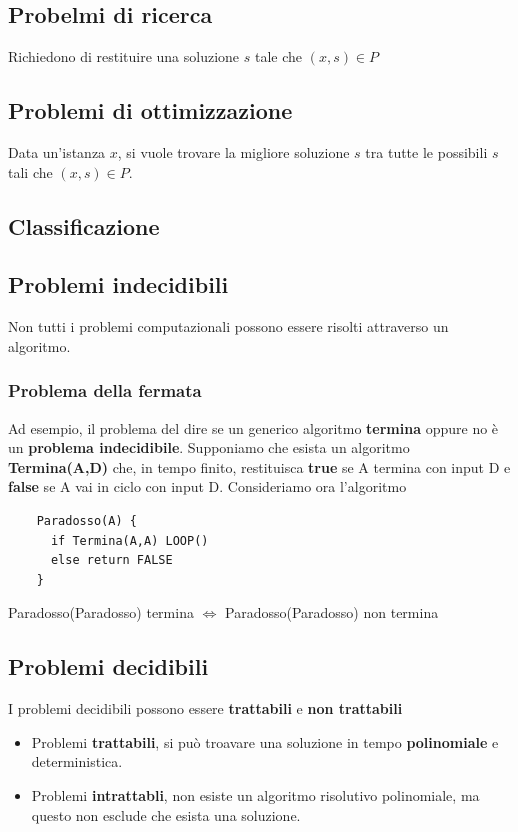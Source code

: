 \documentclass{article}
\begin{document}
\subsection*{Probelmi di ricerca}
Richiedono di restituire una soluzione \(s\) tale che \((x,s) \in P\)
\subsection*{Problemi di ottimizzazione}
Data un'istanza \(x\), si vuole trovare la migliore soluzione \(s\) tra tutte le possibili \(s\) tali che \((x,s) \in P\).

\subsection{Classificazione}
\subsection*{Problemi indecidibili}
Non tutti i problemi computazionali possono essere risolti attraverso un algoritmo.
\subsubsection*{Problema della fermata}
Ad esempio, il problema del dire se un generico algoritmo \textbf{termina} oppure no è un \textbf{problema indecidibile}. Supponiamo che esista un algoritmo \textbf{Termina(A,D)} che, in tempo finito, restituisca \textbf{true} se A termina con input D e \textbf{false} se A vai in ciclo con input D. Consideriamo ora l'algoritmo
\begin{center}
  \begin{verbatim}
    Paradosso(A) {
      if Termina(A,A) LOOP()
      else return FALSE
    }
  \end{verbatim}
  Paradosso(Paradosso) termina \(\iff\) Paradosso(Paradosso) non termina
\end{center}
\subsection*{Problemi decidibili}
I problemi decidibili possono essere \textbf{trattabili} e \textbf{non trattabili}
\begin{itemize}
  \item Problemi \textbf{trattabili}, si può troavare una soluzione in tempo \textbf{polinomiale} e deterministica.
  \item Problemi \textbf{intrattabli}, non esiste un algoritmo risolutivo polinomiale, ma questo non esclude che esista una soluzione.
\end{itemize}
\end{document}
